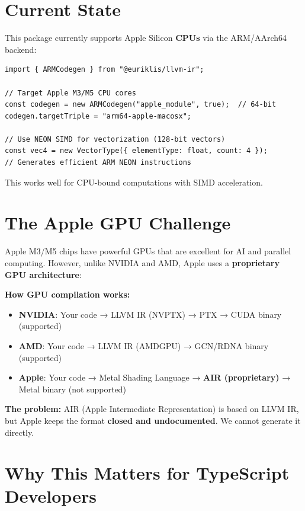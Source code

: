 \documentclass[11pt,oneside]{book}
\begin{document}
\section{Current State}

This package currently supports Apple Silicon \textbf{CPUs} via the ARM/AArch64 backend:

\begin{lstlisting}[style=ts]
import { ARMCodegen } from "@euriklis/llvm-ir";

// Target Apple M3/M5 CPU cores
const codegen = new ARMCodegen("apple_module", true);  // 64-bit
codegen.targetTriple = "arm64-apple-macosx";

// Use NEON SIMD for vectorization (128-bit vectors)
const vec4 = new VectorType({ elementType: float, count: 4 });
// Generates efficient ARM NEON instructions
\end{lstlisting}

This works well for CPU-bound computations with SIMD acceleration.

\section{The Apple GPU Challenge}

Apple M3/M5 chips have powerful GPUs that are excellent for AI and parallel computing. However, unlike NVIDIA and AMD, Apple uses a \textbf{proprietary GPU architecture}:

\textbf{How GPU compilation works:}

\begin{itemize}[noitemsep]
  \item \textbf{NVIDIA}: Your code → LLVM IR (NVPTX) → PTX → CUDA binary (supported)
  \item \textbf{AMD}: Your code → LLVM IR (AMDGPU) → GCN/RDNA binary (supported)
  \item \textbf{Apple}: Your code → Metal Shading Language\cite{metalspec} → \textbf{AIR (proprietary)} → Metal binary (not supported)
\end{itemize}

\textbf{The problem:} AIR (Apple Intermediate Representation) is based on LLVM IR, but Apple keeps the format \textbf{closed and undocumented}\cite{airformat}. We cannot generate it directly.

\section{Why This Matters for TypeScript Developers}
\end{document}
